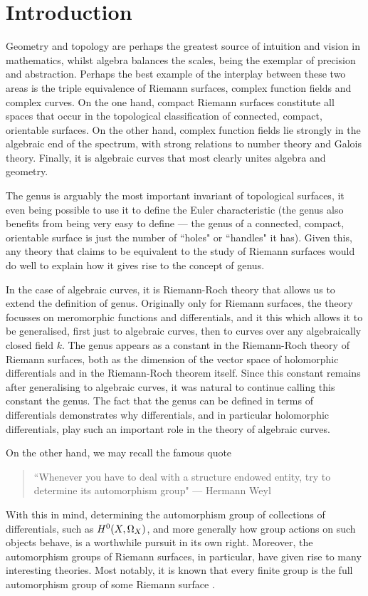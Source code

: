 \chapter{Introduction} \label{Chapter:introduction}


Geometry and topology are perhaps the greatest source of intuition and vision in mathematics, whilst algebra balances the scales, being the exemplar of precision and abstraction. 
Perhaps the best example of the interplay between these two areas is the triple equivalence of Riemann surfaces, complex function fields and complex curves.
On the one hand, compact Riemann surfaces constitute all spaces that occur in the topological classification of connected, compact, orientable surfaces.
On the other hand, complex function fields lie strongly in the algebraic end of the spectrum, with strong relations to number theory and Galois theory.
Finally, it is algebraic curves that most clearly unites algebra and geometry.

The genus is arguably the most important invariant of topological surfaces, it even being possible to use it to define the Euler characteristic (the genus also benefits from being very easy to define --- the genus of a connected, compact, orientable surface is just the number of ``holes" or ``handles" it has).
Given this, any theory that claims to be equivalent to the study of Riemann surfaces would do well to explain how it gives rise to the concept of genus.

In the case of algebraic curves, it is Riemann-Roch theory that allows us to extend the definition of genus.
Originally only for Riemann surfaces, the theory focusses on meromorphic functions and differentials, and it this which allows it to be generalised, first just to algebraic curves, then to curves over any algebraically closed field $k$.
The genus appears as a constant in the Riemann-Roch theory of Riemann surfaces, both as the dimension of the vector space of holomorphic differentials and in the Riemann-Roch theorem itself.
Since this constant remains after generalising to algebraic curves, it was natural to continue calling this constant the genus.
The fact that the genus can be defined in terms of differentials demonstrates why differentials, and in particular holomorphic differentials, play such an important role in the theory of algebraic curves.

\newpage 

On the other hand, we may recall the famous quote
\begin{quotation}
``Whenever you have to deal with a structure endowed entity, try to determine its automorphism group" --- Hermann Weyl
\end{quotation}
With this in mind, determining the automorphism group of collections of differentials, such as ${H^0(X,\Omega_X)}$, and more generally how group actions on such objects behave, is a worthwhile pursuit in its own right.
Moreover, the automorphism groups of Riemann surfaces, in particular, have given rise to many interesting theories.
Most notably, it is known that every finite group is the full automorphism group of some Riemann surface \cite[Thm.\ 6']{greenberg}.

